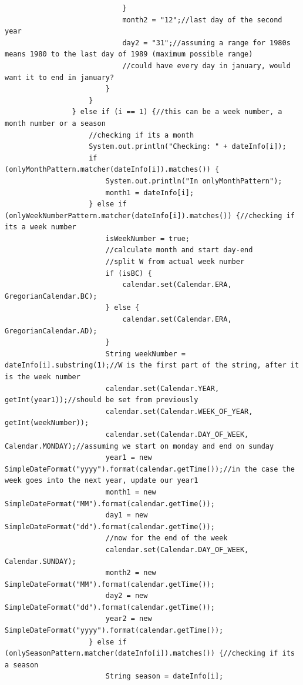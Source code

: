 \begin{lstlisting}
                            }
                            month2 = "12";//last day of the second year
                            day2 = "31";//assuming a range for 1980s means 1980 to the last day of 1989 (maximum possible range)
                            //could have every day in january, would want it to end in january?
                        }
                    }
                } else if (i == 1) {//this can be a week number, a month number or a season
                    //checking if its a month
                    System.out.println("Checking: " + dateInfo[i]);
                    if (onlyMonthPattern.matcher(dateInfo[i]).matches()) {
                        System.out.println("In onlyMonthPattern");
                        month1 = dateInfo[i];
                    } else if (onlyWeekNumberPattern.matcher(dateInfo[i]).matches()) {//checking if its a week number
                        isWeekNumber = true;
                        //calculate month and start day-end
                        //split W from actual week number
                        if (isBC) {
                            calendar.set(Calendar.ERA, GregorianCalendar.BC);
                        } else {
                            calendar.set(Calendar.ERA, GregorianCalendar.AD);
                        }
                        String weekNumber = dateInfo[i].substring(1);//W is the first part of the string, after it is the week number
                        calendar.set(Calendar.YEAR, getInt(year1));//should be set from previously
                        calendar.set(Calendar.WEEK_OF_YEAR, getInt(weekNumber));
                        calendar.set(Calendar.DAY_OF_WEEK, Calendar.MONDAY);//assuming we start on monday and end on sunday
                        year1 = new SimpleDateFormat("yyyy").format(calendar.getTime());//in the case the week goes into the next year, update our year1
                        month1 = new SimpleDateFormat("MM").format(calendar.getTime());
                        day1 = new SimpleDateFormat("dd").format(calendar.getTime());
                        //now for the end of the week
                        calendar.set(Calendar.DAY_OF_WEEK, Calendar.SUNDAY);
                        month2 = new SimpleDateFormat("MM").format(calendar.getTime());
                        day2 = new SimpleDateFormat("dd").format(calendar.getTime());
                        year2 = new SimpleDateFormat("yyyy").format(calendar.getTime());
                    } else if (onlySeasonPattern.matcher(dateInfo[i]).matches()) {//checking if its a season
                        String season = dateInfo[i];

\end{lstlisting}
